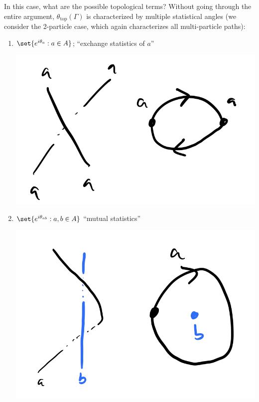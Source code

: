 In this case, what are the possible topological terms? Without going through the entire argument, $\theta_{\text{top}}(\Gamma)$ is characterized by multiple statistical angles (we consider the 2-particle case, which again characterizes all multi-particle paths):
\begin{enumerate}
    \item $\set{e^{i\theta_a}: a \in A}$; ``exchange statistics of $a$''
    \begin{center}
        \includegraphics[scale=0.35]{Lectures/Images/lec5-exchange.png}
    \end{center}
    \item $\set{e^{i\theta_{ab}}: a, b \in A}$ ``mutual statistics'' 
    \begin{center}
        \includegraphics[scale=0.35]{Lectures/Images/lec5-mutual.png}
    \end{center}
\end{enumerate}
